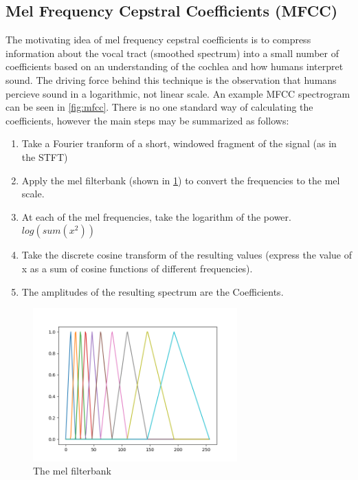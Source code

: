 \documentclass[a4paper, 12pt, twoside]{report}
\begin{document}
\subsection{Mel Frequency Cepstral Coefficients (MFCC)}
\label{sec:org657745a}

The motivating idea of mel frequency cepstral coefficients is to compress information about the vocal tract (smoothed spectrum) into a small number of coefficients based on an understanding of the cochlea and how humans interpret sound. The driving force behind this technique is the observation that humans percieve sound in a logarithmic, not linear scale. An example MFCC spectrogram can be seen in \ref{fig:mfcc}. There is no one standard way of calculating the coefficients, however the main steps may be summarized as follows:

\begin{enumerate}
    \item Take a Fourier tranform of a short, windowed fragment of the signal (as in the STFT)
    \item Apply the mel filterbank (shown in \ref{fig:mel_filterbank}) to convert the frequencies to the mel scale.
    \item At each of the mel frequencies, take the logarithm of the power. $log(sum(x^{2}))$
    \item Take the discrete cosine transform of the resulting values (express the value of x as a sum of cosine functions of different frequencies).
    \item The amplitudes of the resulting spectrum are the Coefficients.
\end{enumerate}

\begin{figure}[h!b]
\centering
\includegraphics[width=0.7\textwidth]{./Figures/mel_filterbank.png}
\caption{\label{fig:mel_filterbank}The mel filterbank}
\end{figure}
\end{document}
